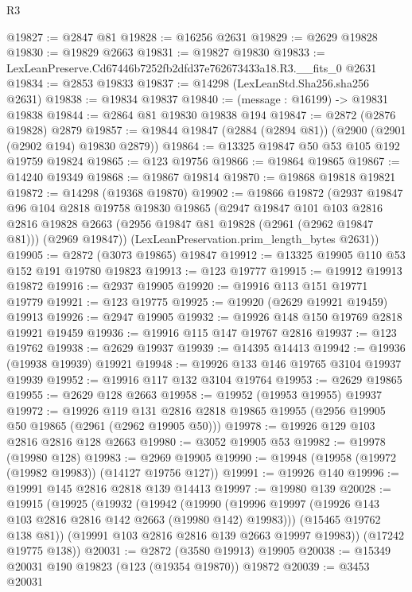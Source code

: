 \begin{lexlean}{R3}
\begin{coremodule}
@19827 := @2847 @81
@19828 := @16256 @2631
@19829 := @2629 @19828
@19830 := @19829 @2663
@19831 := @19827 @19830
@19833 := LexLeanPreserve.Cd67446b7252fb2dfd37e762673433a18.R3.__fits_0 @2631
@19834 := @2853 @19833
@19837 := @14298 (LexLeanStd.Sha256.sha256 @2631)
@19838 := @19834 @19837
@19840 := (message : @16199) -> @19831 @19838
@19844 := @2864 @81 @19830 @19838 @194
@19847 := @2872 (@2876 @19828) @2879
@19857 := @19844 @19847 (@2884 (@2894 @81)) (@2900 (@2901 (@2902 @194) @19830 @2879))
@19864 := @13325 @19847 @50 @53 @105 @192 @19759 @19824
@19865 := @123 @19756
@19866 := @19864 @19865
@19867 := @14240 @19349
@19868 := @19867 @19814
@19870 := @19868 @19818 @19821
@19872 := @14298 (@19368 @19870)
@19902 := @19866
    @19872
    (@2937
      @19847
      @96
      @104
      @2818
      @19758
      @19830
      @19865
      (@2947
        @19847
        @101
        @103
        @2816
        @2816
        @19828
        @2663
        (@2956 @19847 @81 @19828 (@2961 (@2962 @19847 @81)))
        (@2969 @19847))
      (LexLeanPreservation.prim_length_bytes @2631))
@19905 := @2872 (@3073 @19865) @19847
@19912 := @13325 @19905 @110 @53 @152 @191 @19780 @19823
@19913 := @123 @19777
@19915 := @19912 @19913 @19872
@19916 := @2937 @19905
@19920 := @19916 @113 @151 @19771 @19779
@19921 := @123 @19775
@19925 := @19920 (@2629 @19921 @19459) @19913
@19926 := @2947 @19905
@19932 := @19926 @148 @150 @19769 @2818 @19921 @19459
@19936 := @19916 @115 @147 @19767 @2816
@19937 := @123 @19762
@19938 := @2629 @19937
@19939 := @14395 @14413
@19942 := @19936 (@19938 @19939) @19921
@19948 := @19926 @133 @146 @19765 @3104 @19937 @19939
@19952 := @19916 @117 @132 @3104 @19764
@19953 := @2629 @19865
@19955 := @2629 @128 @2663
@19958 := @19952 (@19953 @19955) @19937
@19972 := @19926
    @119
    @131
    @2816
    @2818
    @19865
    @19955
    (@2956 @19905 @50 @19865 (@2961 (@2962 @19905 @50)))
@19978 := @19926 @129 @103 @2816 @2816 @128 @2663
@19980 := @3052 @19905 @53
@19982 := @19978 (@19980 @128)
@19983 := @2969 @19905
@19990 := @19948 (@19958 (@19972 (@19982 @19983)) (@14127 @19756 @127))
@19991 := @19926 @140
@19996 := @19991 @145 @2816 @2818 @139 @14413
@19997 := @19980 @139
@20028 := @19915
    (@19925
      (@19932
        (@19942
          (@19990 (@19996 @19997 (@19926 @143 @103 @2816 @2816 @142 @2663 (@19980 @142) @19983)))
          (@15465 @19762 @138 @81))
        (@19991 @103 @2816 @2816 @139 @2663 @19997 @19983))
      (@17242 @19775 @138))
@20031 := @2872 (@3580 @19913) @19905
@20038 := @15349 @20031 @190 @19823 (@123 (@19354 @19870)) @19872
@20039 := @3453 @20031

\end{coremodule}
\end{lexlean}
